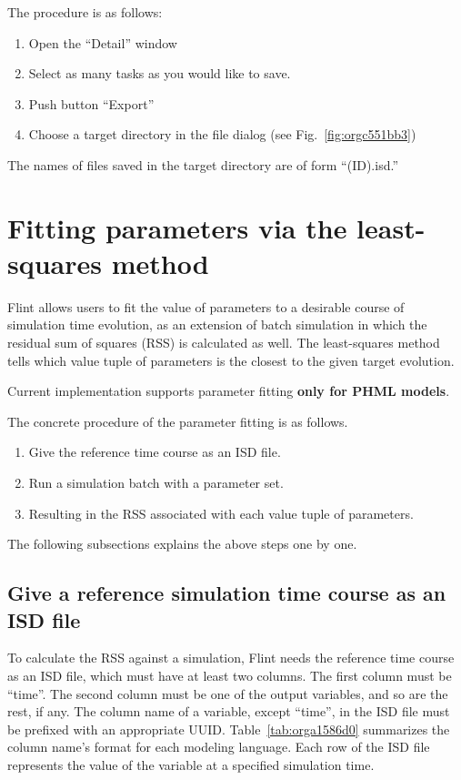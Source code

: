 \documentclass[a4paper,10pt]{report}
\begin{document}
The procedure is as follows:

\begin{enumerate}
\item Open the ``Detail'' window
\item Select as many tasks as you would like to save.
\item Push button ``Export''
\item Choose a target directory in the file dialog (see Fig.~\ref{fig:orgc551bb3})
\end{enumerate}

The names of files saved in the target directory are of form ``(ID).isd.''

\section{Fitting parameters via the least-squares method}
\label{sec:orge86ef34}
Flint allows users to fit the value of parameters to a desirable course of
simulation time evolution, as an extension of batch simulation in which
the residual sum of squares (RSS) is calculated as well. The least-squares
method tells which value tuple of parameters is the closest to the given
target evolution.

Current implementation supports parameter fitting \textbf{only for PHML models}.

The concrete procedure of the parameter fitting is as follows.

\begin{enumerate}
\item Give the reference time course as an ISD file.
\item Run a simulation batch with a parameter set.
\item Resulting in the RSS associated with each value tuple of parameters.
\end{enumerate}

The following subsections explains the above steps one by one.

\subsection{Give a reference simulation time course  as an ISD file}
\label{sec:orgc92f8f9}
To calculate the RSS against a simulation, Flint needs the reference time course
as an ISD file, which must have at least two columns.
The first column must be ``time''. The second column must be one of the output
variables, and so are the rest, if any.
The column name of a variable, except ``time'', in the ISD file must be prefixed
with an appropriate UUID.
Table~\ref{tab:orga1586d0} summarizes the column name's format for each
modeling language.
Each row of the ISD file represents the value of the variable at a specified
simulation time.
\end{document}
